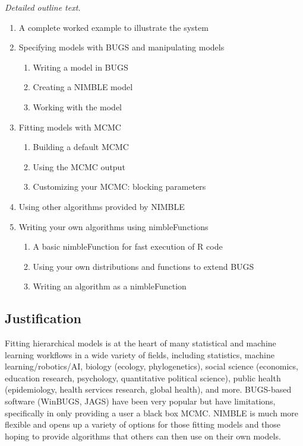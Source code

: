 \documentclass[]{article}
\begin{document}
\emph{Detailed outline text.}

\begin{enumerate}
\item A complete worked example to illustrate the system
\item Specifying models with BUGS and manipulating models
\begin{enumerate}
\item Writing a model in BUGS
\item Creating a NIMBLE model
\item Working with the model
\end{enumerate}
\item Fitting models with MCMC
\begin{enumerate}
\item Building a default MCMC
\item Using the MCMC output
\item Customizing your MCMC: blocking parameters
\end{enumerate}
\item Using other algorithms provided by NIMBLE
\item Writing your own algorithms using nimbleFunctions
\begin{enumerate}
\item A basic nimbleFunction for fast execution of R code
\item Using your own distributions and functions to extend BUGS
\item Writing an algorithm as a nimbleFunction
\end{enumerate}
\end{enumerate}

\subsection{Justification}\label{justification}

Fitting hierarchical models is at the heart of many statistical and machine learning workflows in a wide variety of fields, including statistics, machine learning/robotics/AI, biology (ecology, phylogenetics), social science (economics, education research, psychology, quantitative political science), public health (epidemiology, health services research, global health), and more. BUGS-based software (WinBUGS, JAGS) have been very popular but have limitations, specifically in only providing a user a black box MCMC. NIMBLE is much more flexible and opens up a variety of options for those fitting models and those hoping to provide algorithms that others can then use on their own models. 
\end{document}
